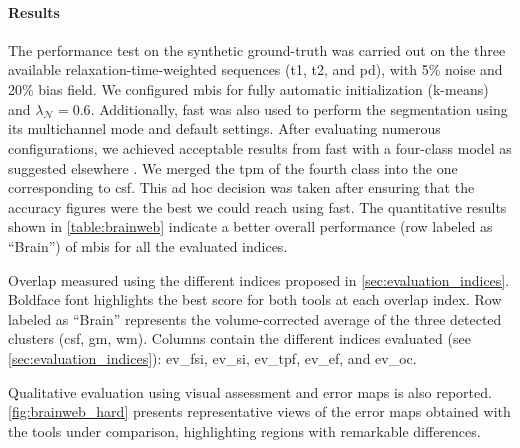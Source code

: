 \paragraph{Results}%
The performance test on the synthetic ground-truth was carried out on
  the three available relaxation-time-weighted sequences
  (\gls*{t1}, \gls*{t2}, and \gls*{pd}), with 5\% noise
  and 20\% bias field.
We configured \gls*{mbis} for fully automatic initialization (k-means)
  and $\lambda_\mathcal{N}=0.6$.
Additionally, \gls*{fast} was also used to perform the segmentation using
  its multichannel mode and default settings.
After evaluating numerous configurations, we achieved acceptable results 
  from \gls*{fast} with a four-class model as suggested elsewhere
  \citep{he_generalized_2008}.
We merged the \gls*{tpm} of the fourth class into the one corresponding to \gls*{csf}.
This ad hoc decision was taken after ensuring that the accuracy figures were the
  best we could reach using \gls*{fast}.
The quantitative results shown in \autoref{table:brainweb} indicate a better overall
  performance (row labeled as ``Brain'') of \gls*{mbis} for all the evaluated indices.
\begin{table}[!htbp]
\caption[Quantitative results of the accuracy assessment]{Overlap measured using
  the different indices proposed in \autoref{sec:evaluation_indices}. Boldface font
  highlights the best score for both tools at each overlap index.
  Row labeled as ``Brain'' represents the volume-corrected average of 
  the three detected clusters (\gls*{csf}, \gls*{gm}, \gls*{wm}). Columns contain
  the different indices evaluated (see \autoref{sec:evaluation_indices}):
  \acrfull*{ev_fsi}, \acrfull*{ev_si}, \acrfull*{ev_tpf}, \acrfull*{ev_ef}, and \acrfull*{ev_oc}.
  \label{table:brainweb}}
  
\end{table}

Qualitative evaluation using visual assessment and error maps is also reported.
\autoref{fig:brainweb_hard} presents representative views of the error maps
  obtained with the tools under comparison, highlighting regions with remarkable
  differences.
  

